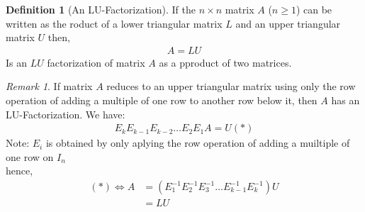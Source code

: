 \documentclass{jhwhw}
\theoremstyle{definition}
\newtheorem{definition}{Definition}
\theoremstyle{remark}
\newtheorem*{remark}{Remark}
\theoremstyle{example}
\begin{document}
\begin{definition}[An LU-Factorization] If the \(n \times n\) matrix \(A\) (\(n \geq 1\)) can be written as the roduct of a lower triangular matrix \(L\) and an upper triangular matrix \(U\) then,
\begin{align*} A = LU \end{align*} 
Is an \(LU\) factorization of matrix \(A\) as a pproduct of two matrices.\end{definition}
\begin{remark} If matrix \(A\) reduces to an upper triangular matrix using only the row operation of adding a multiple of one row to another row below it, then \(A\) has an LU-Factorization. We have:
\begin{align*} E_k E_{k-1} E_{k-2} \ldots E_2 E_1 A = U (\ast) \end{align*}
Note: \(E_i\) is obtained by only aplying the row operation of adding a muiltiple of one row on \(I_n\)\\
hence, \begin{align*} (\ast) \Leftrightarrow A &= (E^{-1}_1 E^{-1}_2 E^{-1}_3 \ldots E^{-1}_{k-1} E^{-1}_k)U\\
&= LU \end{align*} \end{remark}
\end{document}

